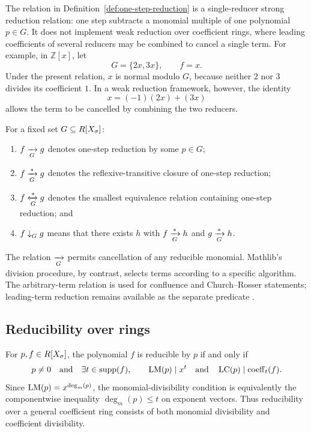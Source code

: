 \begin{remark}
\label{rem:strong-reduction}
The relation in Definition~\ref{def:one-step-reduction} is a single-reducer
strong reduction relation: one step subtracts a monomial multiple of one
polynomial $p\in G$.  It does not implement weak reduction over coefficient
rings, where leading coefficients of several reducers may be combined to
cancel a single term.  For example, in $\mathbb{Z}[x]$, let
\[
  G=\{2x,3x\},\qquad f=x.
\]
Under the present relation, $x$ is normal modulo $G$, because neither $2$ nor
$3$ divides its coefficient $1$.  In a weak reduction framework, however, the
identity
\[
  x=(-1)(2x)+(3x)
\]
allows the term to be cancelled by combining the two reducers.
\end{remark}

\begin{definition}
\label{def:reduction-closures}
For a fixed set $G\subseteq R[X_\sigma]$:
\begin{enumerate}[label=(\roman*),leftmargin=2em]
  \item $f\xrightarrow[G]{}g$ denotes one-step reduction by some $p\in G$;
  \item $f\xrightarrow[G]{*}g$ denotes the reflexive-transitive closure of
        one-step reduction;
  \item $f\xleftrightarrow[G]{*}g$ denotes the smallest equivalence relation containing
        one-step reduction; and
  \item $f\mathrel{\downarrow}_{G}g$ means that there exists $h$ with
        $f\xrightarrow[G]{*}h$ and $g\xrightarrow[G]{*}h$.
\end{enumerate}
\end{definition}

The relation $\xrightarrow[G]{}$ permits cancellation of any reducible monomial.
Mathlib's division procedure, by contrast, selects terms according to a
specific algorithm.  The arbitrary-term relation is used for confluence and
Church--Rosser statements; leading-term reduction remains available as the
separate predicate .

\subsection{Reducibility over rings}

\begin{proposition}
\label{prop:reducibility-ring}
For $p,f\in R[X_\sigma]$, the polynomial $f$ is reducible by $p$ if and only if
\[
  p\neq0
  \quad\text{and}\quad
  \exists t\in\operatorname{supp}(f),\qquad
    \operatorname{LM}(p)\mid x^t
    \quad\text{and}\quad
    \operatorname{LC}(p)\mid\operatorname{coeff}_t(f).
\]
Since $\operatorname{LM}(p)=x^{\deg_m(p)}$, the monomial-divisibility condition is
equivalently the componentwise inequality $\deg_m(p)\leq t$ on exponent
vectors.  Thus reducibility over a general coefficient ring consists of both
monomial divisibility and coefficient divisibility.
\end{proposition}

